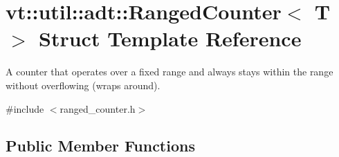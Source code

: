 \hypertarget{structvt_1_1util_1_1adt_1_1_ranged_counter}{}\section{vt\+:\+:util\+:\+:adt\+:\+:Ranged\+Counter$<$ T $>$ Struct Template Reference}
\label{structvt_1_1util_1_1adt_1_1_ranged_counter}


A counter that operates over a fixed range and always stays within the range without overflowing (wraps around).  




{\ttfamily \#include $<$ranged\+\_\+counter.\+h$>$}

\subsection*{Public Member Functions}
